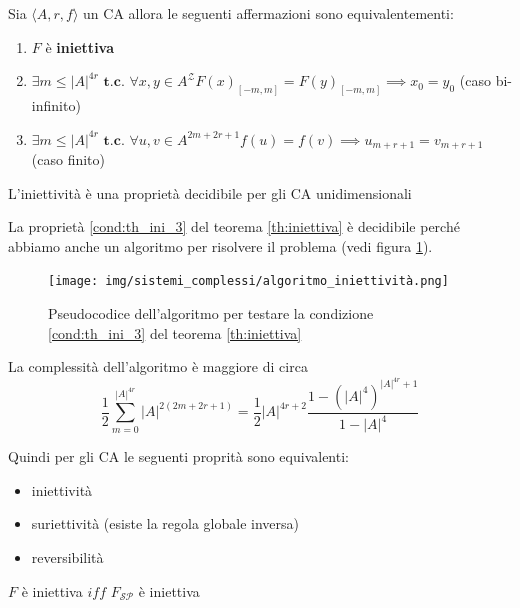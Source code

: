 \begin{teorema}
    \label{th:iniettiva}
    Sia $\langle A,r,f\rangle$ un CA allora le seguenti affermazioni sono equivalentementi:
    \begin{enumerate}
        \item $F$ è \textbf{iniettiva}
        \item $\exists m \le |A|^{4r} \textbf{ t.c. } \forall x, y \in A^\mathcal{Z} F(x)_{[-m,m]}=F(y)_{[-m,m]} \implies x_0=y_0$
        (caso bi-infinito)
        \item \label{cond:th_ini_3}$\exists m \le |A|^{4r} \textbf{ t.c. } \forall u,v \in A^{2m+2r+1} f(u)= f(v) \implies u_{m+r+1} = v_{m+r+1}$
        (caso finito)
    \end{enumerate}
\end{teorema}
\begin{teorema}
    L'iniettività è una proprietà decidibile per gli CA unidimensionali
    
\end{teorema}
La proprietà \ref{cond:th_ini_3} del teorema \ref{th:iniettiva} è decidibile perché
abbiamo anche un algoritmo per risolvere il problema (vedi figura \ref{fig:algo_iniettiva}).
\begin{figure}[!h]
    \centering
    \texttt{[image: img/sistemi\_complessi/algoritmo\_iniettività.png]}
    \caption{Pseudocodice dell'algoritmo per testare la condizione \ref{cond:th_ini_3} del teorema \ref{th:iniettiva}}
    \label{fig:algo_iniettiva}
\end{figure}
\begin{nota}
    La complessità dell'algoritmo è maggiore di circa
    \begin{equation*}
        \frac{1}{2} \sum_{m=0}^{|A|^{4r}} |A|^{2(2m+2r+1)} = \frac{1}{2}  |A|^{4r+2}
        \frac{1-(|A|^4)^{|A|^{4r}+1}}{1-|A|^4}
    \end{equation*}
\end{nota}

Quindi per gli CA le seguenti proprità sono equivalenti:
\begin{itemize}
    \item iniettività
    \item suriettività (esiste la regola globale inversa)
    \item reversibilità
\end{itemize}

\begin{teorema}
    $F$ è iniettiva $iff$ $F_{\mathcal{SP}}$ è iniettiva
\end{teorema}

